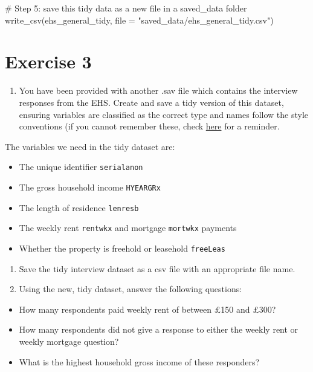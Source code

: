 \documentclass[
  letterpaper,
  DIV=11,
  numbers=noendperiod]{scrreprt}
\newenvironment{Shaded}{\begin{snugshade}}{\end{snugshade}}
\newcommand{\AttributeTok}[1]{\textcolor[rgb]{0.40,0.45,0.13}{#1}}
\newcommand{\CommentTok}[1]{\textcolor[rgb]{0.37,0.37,0.37}{#1}}
\newcommand{\FunctionTok}[1]{\textcolor[rgb]{0.28,0.35,0.67}{#1}}
\newcommand{\NormalTok}[1]{\textcolor[rgb]{0.00,0.23,0.31}{#1}}
\newcommand{\StringTok}[1]{\textcolor[rgb]{0.13,0.47,0.30}{#1}}
\providecommand{\tightlist}{%
  \setlength{\itemsep}{0pt}\setlength{\parskip}{0pt}}\usepackage{longtable,booktabs,array}
\begin{document}
\begin{Shaded}
\begin{Highlighting}[]
\CommentTok{\# Step 5: save this tidy data as a new file in a saved\_data folder}
\FunctionTok{write\_csv}\NormalTok{(ehs\_general\_tidy, }\AttributeTok{file =} \StringTok{"saved\_data/ehs\_general\_tidy.csv"}\NormalTok{)}
\end{Highlighting}
\end{Shaded}

\section{Exercise 3}\label{exercise-3}

\begin{enumerate}
\def\labelenumi{\arabic{enumi}.}
\tightlist
\item
  You have been provided with another .sav file which contains the
  interview responses from the EHS. Create and save a tidy version of
  this dataset, ensuring variables are classified as the correct type
  and names follow the style conventions (if you cannot remember these,
  check \href{https://style.tidyverse.org/syntax.html}{here} for a
  reminder.
\end{enumerate}

The variables we need in the tidy dataset are:

\begin{itemize}
\tightlist
\item
  The unique identifier \texttt{serialanon}
\item
  The gross household income \texttt{HYEARGRx}
\item
  The length of residence \texttt{lenresb}
\item
  The weekly rent \texttt{rentwkx} and mortgage \texttt{mortwkx}
  payments
\item
  Whether the property is freehold or leasehold \texttt{freeLeas}
\end{itemize}

\begin{enumerate}
\def\labelenumi{\arabic{enumi}.}
\setcounter{enumi}{1}
\item
  Save the tidy interview dataset as a csv file with an appropriate file
  name.
\item
  Using the new, tidy dataset, answer the following questions:
\end{enumerate}

\begin{itemize}
\tightlist
\item
  How many respondents paid weekly rent of between £150 and £300?
\item
  How many respondents did not give a response to either the weekly rent
  or weekly mortgage question?
\item
  What is the highest household gross income of these responders?
\end{itemize}
\end{document}
